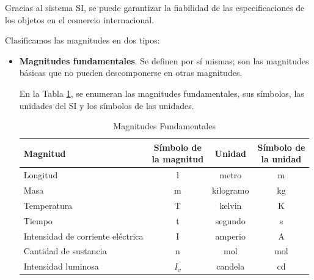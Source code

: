 Gracias al sistema SI, se puede garantizar la fiabilidad de las especificaciones de los objetos en el comercio internacional.

Clasificamos las magnitudes en dos tipos:

\begin{itemize}
    \item \textbf{Magnitudes fundamentales}.
    Se definen por sí mismas; son las magnitudes básicas que no pueden descomponerse en otras magnitudes.

    En la Tabla \ref{tab:magnitudes_fundamentales}, se enumeran las magnitudes fundamentales, sus símbolos, las unidades del SI y los símbolos de las unidades.


    \begin{table}[H]
        \centering
        \caption{Magnitudes Fundamentales}
        \vspace{-5pt}
        \begin{tabular}{@{}lccc@{}}
            \toprule
            \textbf{Magnitud} & \makecell{\textbf{Símbolo de} \\ \textbf{la magnitud}}              & \textbf{Unidad}         & \makecell{\textbf{Símbolo de} \\ \textbf{la unidad}}                \\
            \midrule
            Longitud         & l         & metro   & \unit{\m} \\[3pt]
            Masa                & m         & kilogramo   & \unit{\kilo\g} \\[3pt]
            Temperatura    & T         & kelvin   & \unit{\kelvin} \\[3pt]
            Tiempo & t         & segundo     & \unit{\s} \\[3pt]
            Intensidad de corriente eléctrica  & I & amperio  & \unit{\ampere} \\[3pt]
            Cantidad de sustancia  & n & mol  & \unit{\mole} \\[3pt]
            Intensidad luminosa  & \( I_v \) & candela  & \unit{\candela} \\
            \bottomrule
        \end{tabular}
        \label{tab:magnitudes_fundamentales}
    \end{table}


\end{itemize}
